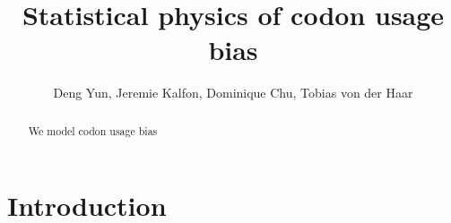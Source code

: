 \documentclass[a4paper,10pt]{paper}%
\begin{document}
\title{Statistical physics of codon usage bias}

\author{%
Deng Yun, Jeremie Kalfon,  Dominique Chu, Tobias von der Haar}





\maketitle

\begin{abstract}
We model codon usage bias
\end{abstract}


\section{Introduction }
\end{document}
